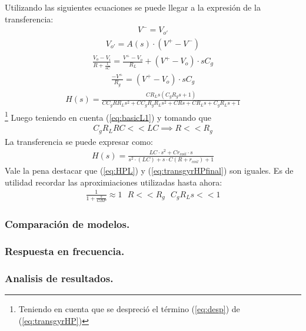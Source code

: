 \documentclass[a4paper]{article}
\begin{document}
Utilizando las siguientes ecuaciones se puede llegar a la expresión de la transferencia:
\begin{align}V^- = V_{o'}\end{align}
\begin{align}V_{o'} = A(s)\cdot (V^+-V^-)\end{align}
\begin{align}\frac{V_o-V_i}{R+\frac{1}{sC}} = \frac{V^+-V_o}{R_L}+(V^+-V_o)\cdot sC_g\end{align}
\begin{align}\frac{-V^+}{R_g}=(V^+-V_o)\cdot sC_g\end{align}
\begin{align} H(s) = \frac{C R_L s \left(C_g R_g s + 1\right)}{C C_g R R_L s^{2} + C C_g R_g R_L s^{2} + C R s + C R_L s + C_g R_L s + 1}\label{eq:transgyrHP}\end{align}\footnote{Teniendo en cuenta que se despreció el término (\ref{eq:desp}) de (\ref{eq:transgyrHP})}
Luego teniendo en cuenta (\ref{eq:basicL1}) y tomando que
\begin{align} C_gR_LRC<<LC \implies R<<R_g \end{align}
La transferencia  se puede expresar como:
 \begin{align} H(s) = \frac{LC\cdot s^2+Cr_{coil}\cdot s}{s^2 \cdot (LC)+s\cdot C(R+r_{coil})+1}\label{eq:transgyrHPfinal} 
\end{align}
Vale la pena destacar que (\ref{eq:HPL}) y (\ref{eq:transgyrHPfinal}) son iguales.
Es de utilidad recordar las aproximiaciones utilizadas hasta ahora:
\begin{align}  \frac{1}{1+\frac{s}{GBP}}\approx 1  \ \ \ R<<R_g \ \ \ C_gR_Ls << 1 \label{eq:basicL2}\end{align}
\subsubsection{Comparación de modelos.}
\subsubsection{Respuesta en frecuencia.}
\subsubsection{Analisis de resultados.}

\newpage
\end{document}
